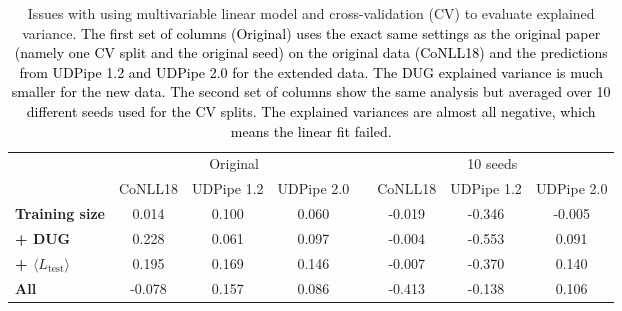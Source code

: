 \documentclass[11pt,a4paper]{article}
\newcommand{\MTL}{{$\langle L_{\textrm{test}}\rangle$}}
\begin{document}

\begin{table*}[htbp!]
    \centering
    \small
    \begin{tabular}{l ccc c ccc}
    \toprule
    & \multicolumn{3}{c}{Original} && \multicolumn{3}{c}{10 seeds}\\
    &  CoNLL18 & UDPipe 1.2 & UDPipe 2.0 & &  CoNLL18 & UDPipe 1.2 & UDPipe 2.0 \\
    \midrule%
    \textbf{Training size} & 0.014 & 0.100 & 0.060 & &  -0.019 & -0.346 & -0.005 \\
    \textbf{+ DUG} & 0.228 & 0.061 & 0.097 && -0.004 & -0.553 & 0.091 \\
    \textbf{+ \MTL} & 0.195 & 0.169 & 0.146 && -0.007 & -0.370 & 0.140 \\
    \midrule
    \textbf{All}  & -0.078 & 0.157 & 0.086 && -0.413 & -0.138 & 0.106 \\
    \bottomrule
    \end{tabular}
    \caption{Issues with using multivariable linear model and cross-validation (CV) to evaluate explained variance. \textcolor{black}{The first set of columns (Original) uses the exact same settings as the original paper (namely one CV split and the original seed) on the original data (CoNLL18) and the predictions from UDPipe 1.2 and UDPipe 2.0 for the extended data. The DUG explained variance is much smaller for the new data. The second set of columns show the same analysis but averaged over 10 different seeds used for the CV splits. The explained variances are almost all negative, which means the linear fit failed.}}
    \label{tab:replication}
\end{table*}
\end{document}
